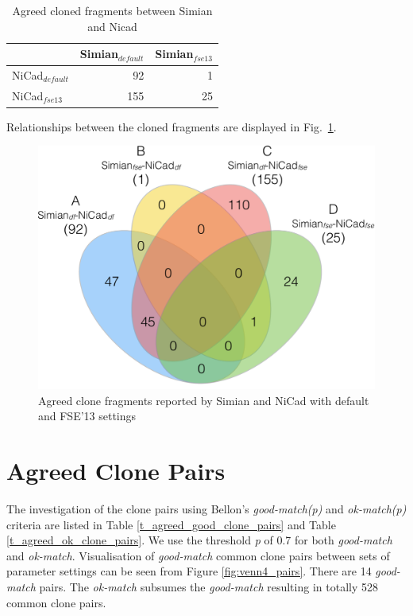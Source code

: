 \documentclass{IEEEtran}
\begin{document}
\begin{table}[h]
	\centering
	\caption{Agreed cloned fragments between Simian and Nicad}
	\label{t_agreed_clone}
	\begin{tabular}{l|r|r}
		\hline
		& Simian$_{\mathrm{\textit{default}}}$ & Simian$_{\mathrm{\textit{fse13}}}$ \\ %
		\hline
		NiCad$_{\mathrm{\textit{default}}}$ & 92          & 1        \\%
		NiCad$_{\mathrm{\textit{fse13}}}$   & 155         & 25           \\ %
		\hline
	\end{tabular}
\end{table}

Relationships between the cloned fragments are displayed in Fig.~\ref{fig:venn4}.

\begin{figure}[H]
\centering
\includegraphics[width=0.5\linewidth]{venn4}
\caption[Agreed clone fragments reported by Simian and NiCad with default and FSE'13 settings]{Agreed clone fragments reported by Simian and NiCad with default and FSE'13 settings}
\label{fig:venn4}
\end{figure}

\section*{Agreed Clone Pairs}
The investigation of the clone pairs using Bellon's \textit{good-match(p)} and \textit{ok-match(p)} criteria are listed in  Table \ref{t_agreed_good_clone_pairs} and Table \ref{t_agreed_ok_clone_pairs}. We use the threshold \textit{p} of 0.7 for both \textit{good-match} and \textit{ok-match}. Visualisation of \textit{good-match} common clone pairs between sets of parameter settings can be seen from Figure \ref{fig:venn4_pairs}. There are 14 \textit{good-match} pairs. The \textit{ok-match} subsumes the \textit{good-match} resulting in totally 528 common clone pairs.
\end{document}
